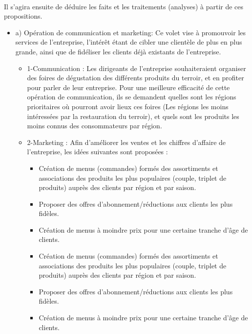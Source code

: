 \paragraph{}Il s’agira ensuite de déduire les faits et les traitements (analyses) à partir de ces propositions.
\begin{itemize}
    \item a) Opération de communication et marketing: Ce volet vise à promouvoir les services de l’entreprise, l’intérêt étant de cibler une clientèle de plus en plus grande, ainsi que de fidéliser les clients déjà existants de l’entreprise.
        \\
        \begin{itemize}
            \item 1-Communication : Les dirigeants de l’entreprise souhaiteraient organiser des foires de dégustation des différents produits du terroir, et en profiter pour parler de leur entreprise.  Pour une meilleure efficacité de cette opération de communication, ils se demandent quelles sont les régions prioritaires où pourront avoir lieux ces foires (Les régions les moins intéressées par la restauration du terroir), et quels sont les produits les moins connus des consommateurs par région.
            \item 2-Marketing : Afin d’améliorer les ventes et les chiffres d’affaire de l’entreprise, les idées suivantes sont proposées : 
                \\
                \begin{itemize}
                    \item Création de menus (commandes) formés des assortiments et associations des produits les plus populaires (couple, triplet de produits) auprès des clients par région et par saison.
                    \item Proposer des offres d’abonnement/réductions aux clients les plus fidèles.
                    \item Création de menus à moindre prix pour une certaine tranche d’âge de clients.
                    \item Création de menus (commandes) formés des assortiments et associations des produits les plus populaires (couple, triplet de produits) auprès des clients par région et par saison.
                    \item Proposer des offres d’abonnement/réductions aux clients les plus fidèles.
                    \item Création de menus à moindre prix pour une certaine tranche d’âge de clients.

\end{itemize}
\end{itemize}
\end{itemize}
